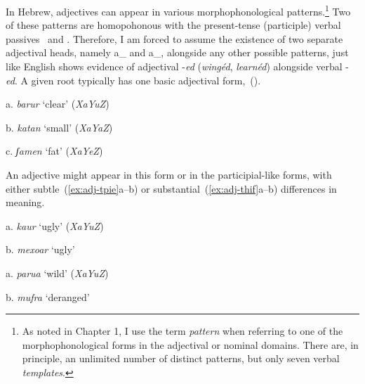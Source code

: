 In Hebrew, adjectives can appear in various morphophonological patterns.\footnote{As noted in Chapter 1, I use the term \emph{pattern} when referring to one of the morphophonological forms in the adjectival or nominal domains. There are, in principle, an unlimited number of distinct patterns, but only seven verbal \emph{templates}.} Two of these patterns are homopohonous with the present-tense (participle) verbal passives \mpua~and \mhuf. Therefore, I am forced to assume the existence of two separate adjectival heads, namely a_{} and a_{}, alongside any other possible patterns, just like English shows evidence of adjectival -\emph{ed} (\emph{wingéd}, \emph{learnéd}) alongside verbal -\emph{ed}. A given root typically has one basic adjectival form,~(\nextx).
\ex
	\begin{minipage}[t]{0.3\textwidth}
		a. \emph{barur} `clear' (\emph{XaYuZ})\\
	\end{minipage}
	\begin{minipage}[t]{0.3\textwidth}
		b. \emph{katan} `small' (\emph{XaYaZ})\\
	\end{minipage}
	\begin{minipage}[t]{0.3\textwidth}
		c. \emph{ʃamen} `fat' (\emph{XaYeZ})\\
	\end{minipage}
\xe
An adjective might appear in this form or in the participial-like forms, with either subtle~(\ref{ex:adj-tpie}a--b) or substantial~(\ref{ex:adj-thif}a--b) differences in meaning.
\ex\label{ex:adj-tpie}
	\begin{minipage}[t]{0.3\textwidth}
		a. \emph{kaur} `ugly' (\emph{XaYuZ})\\
	\end{minipage}
	\begin{minipage}[t]{0.3\textwidth}
		b. \emph{mexoar} `ugly'\\
	\end{minipage}
\xe

\ex\label{ex:adj-thif}
	\begin{minipage}[t]{0.3\textwidth}
		a. \emph{parua} `wild' (\emph{XaYuZ})\\
	\end{minipage}
	\begin{minipage}[t]{0.3\textwidth}
		b. \emph{mufra} `deranged'\\
	\end{minipage}
\xe

